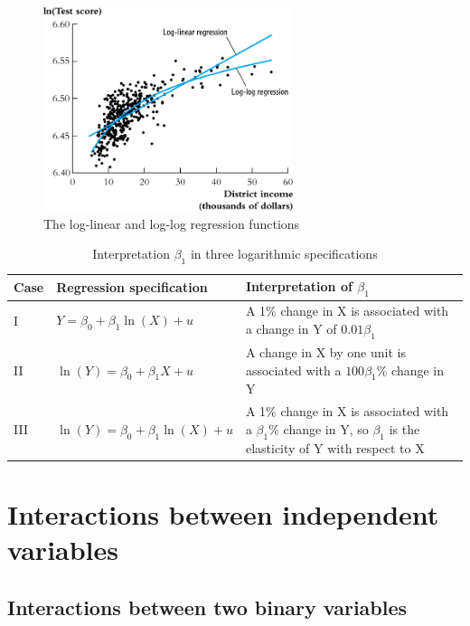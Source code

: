 \documentclass[a4paper,11pt]{article}
\begin{document}
\begin{itemize}
\begin{figure}[htbp]
\centering
\includegraphics[width=0.65\textwidth]{img/fig-8-6.png}
\caption{\label{fig:orga791f55}
The log-linear and log-log regression functions}
\end{figure}

\begin{table}[htbp]
\caption{Interpretation \(\beta_1\) in three logarithmic specifications}
\centering
\begin{tabular}{lp{4.5cm}p{8.5cm}}
Case & Regression specification & Interpretation of \(\beta_1\)\\
\hline
I & \(Y = \beta_0 + \beta_1 \ln(X) + u\) & A 1\% change in X is associated with a change in Y of \(0.01\beta_{1}\)\\
II & \(\ln(Y) = \beta_0 + \beta_1 X + u\) & A change in X by one unit is associated with a \(100\beta_1\%\) change in Y\\
III & \(\ln(Y) = \beta_0 + \beta_1 \ln(X) + u\) & A 1\% change in X is associated with a \(\beta_{1}\%\) change in Y, so \(\beta_1\) is the elasticity of Y with respect to X\\
\end{tabular}
\end{table}
\end{itemize}


\section{Interactions between independent variables}
\label{sec:org927e22d}

\subsection{Interactions between two binary variables}
\label{sec:org752f644}
\end{document}
